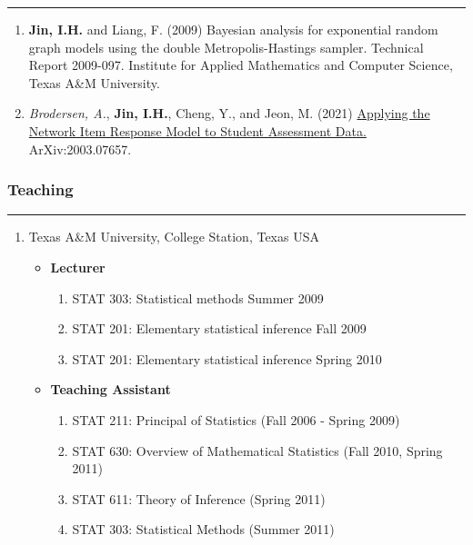 \documentclass[
]{book}
\providecommand{\tightlist}{%
  \setlength{\itemsep}{0pt}\setlength{\parskip}{0pt}}
\begin{document}
\begin{center}\rule{0.5\linewidth}{0.5pt}\end{center}

\begin{enumerate}
\def\labelenumi{\arabic{enumi}.}
\item
  \textbf{Jin, I.H.} and Liang, F. (2009) Bayesian analysis for exponential random graph models using the double Metropolis-Hastings sampler. Technical Report 2009-097. Institute for Applied Mathematics and Computer Science, Texas A\&M University.
\item
  \emph{Brodersen, A.}, \textbf{Jin, I.H.}, Cheng, Y., and Jeon, M. (2021) \href{https://arxiv.org/abs/2003.07657}{Applying the Network Item Response Model to Student Assessment Data.} ArXiv:2003.07657.
\end{enumerate}

\hypertarget{teaching}{%
\subsubsection*{Teaching}\label{teaching}}

\begin{center}\rule{0.5\linewidth}{0.5pt}\end{center}

\begin{enumerate}
\def\labelenumi{\arabic{enumi}.}
\item
  Texas A\&M University, College Station, Texas USA

  \begin{itemize}
  \tightlist
  \item
    \textbf{Lecturer}

    \begin{enumerate}
    \def\labelenumii{\arabic{enumii}.}
    \tightlist
    \item
      STAT 303: Statistical methods Summer 2009
    \item
      STAT 201: Elementary statistical inference Fall 2009
    \item
      STAT 201: Elementary statistical inference Spring 2010
    \end{enumerate}
  \item
    \textbf{Teaching Assistant}

    \begin{enumerate}
    \def\labelenumii{\arabic{enumii}.}
    \tightlist
    \item
      STAT 211: Principal of Statistics (Fall 2006 - Spring 2009)
    \item
      STAT 630: Overview of Mathematical Statistics (Fall 2010, Spring 2011)
    \item
      STAT 611: Theory of Inference (Spring 2011)
    \item
      STAT 303: Statistical Methods (Summer 2011)
    \end{enumerate}
  \end{itemize}
\end{enumerate}
\end{document}
